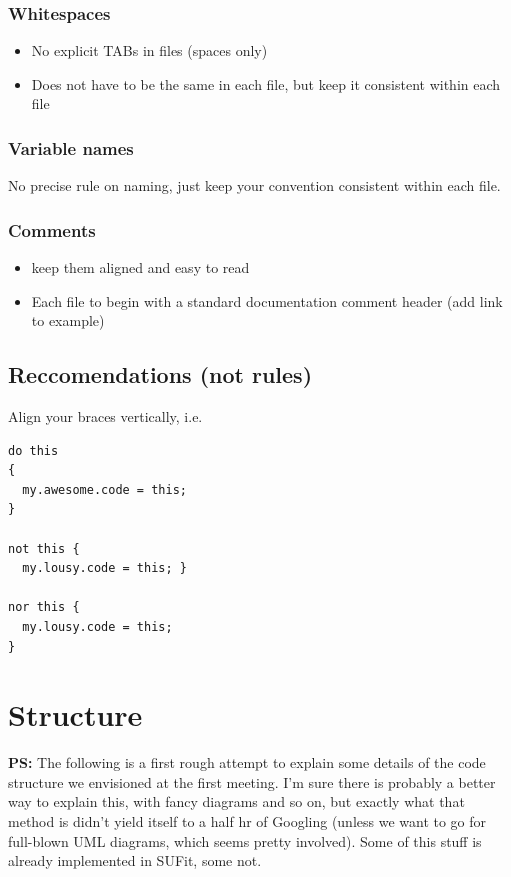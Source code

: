 \subsubsection{Whitespaces} 
\begin{itemize} 
  \item No explicit TABs in files (spaces only)
  \item Does not have to be the same in each file, but keep it consistent within each file
\end{itemize}

\subsubsection{Variable names} No precise rule on naming, just keep your convention consistent within each file.

\subsubsection{Comments} 
\begin{itemize} 
  \item keep them aligned and easy to read
  \item Each file to begin with a standard documentation comment header (add link to example)
\end{itemize} 


\subsection{Reccomendations (not rules)}

Align your braces vertically, i.e. 
\begin{verbatim}
do this
{ 
  my.awesome.code = this;
}

not this {
  my.lousy.code = this; }

nor this {
  my.lousy.code = this; 
}
\end{verbatim}

\section{Structure}

\textbf{PS:} The following is a first rough attempt to explain some details of the code structure we envisioned at the first meeting.  I'm sure there is probably a better way to explain this, with fancy diagrams and so on, but exactly what that method is didn't yield itself to a half hr of Googling (unless we want to go for full-blown UML diagrams, which seems pretty involved).  Some of this stuff is already implemented in SUFit, some not.

